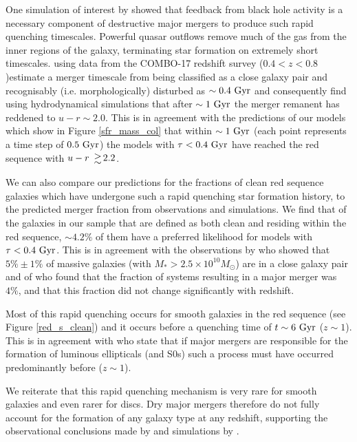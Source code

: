 \documentclass[useAMS,usenatbib]{mn2e}
\begin{document}
One simulation of interest by \citet{Springel05} showed that feedback from black hole activity is a necessary component of destructive major mergers to produce such rapid quenching timescales. Powerful quasar outflows remove much of the gas from the inner regions of the galaxy, terminating star formation on extremely short timescales. \citet{Bell06} using data from the COMBO-17 redshift survey ($0.4 < z < 0.8$)estimate a merger timescale from being classified as a close galaxy pair and recognisably (i.e. morphologically) disturbed as $\sim 0.4~\rm{Gyr}$ and \citet{Springel05} consequently find using hydrodynamical simulations that after $\sim1~\rm{Gyr}$ the merger remanent has reddened to $u-r \sim 2.0$. This is in agreement with the predictions of our models which show in Figure \ref{sfr_mass_col} that within $\sim1~\rm{Gyr}$ (each point represents a time step of $0.5~\rm{Gyr}$) the models with $\tau < 0.4~\rm{Gyr}$ have reached the red sequence with $u-r ~\ga 2.2$. 

We can also compare our predictions for the fractions of clean red sequence galaxies which have undergone such a rapid quenching star formation history, to the predicted merger fraction from observations and simulations. We find that of the galaxies in our sample that are defined as both clean and residing within the red sequence, $\sim4.2\%$ of them have a preferred likelihood for models with $\tau < 0.4~\rm{Gyr}$. This is in agreement with the observations by \citet{Bell06} who showed that $5\% \pm 1\%$ of massive galaxies (with $M_* > 2.5 \times 10^{10} M_{\odot}$) are in a close galaxy pair and of \citet{Bundy09} who found that the fraction of systems resulting in a major merger was $4\%$, and that this fraction did not change significantly with redshift. 

Most of this rapid quenching occurs for smooth galaxies in the red sequence (see Figure \ref{red_s_clean}) and it occurs before a quenching time of $t\sim6~\rm{Gyr}$ ($z\sim1$). This is in agreement with \citet{Im02} who state that if major mergers are responsible for the formation of luminous ellipticals (and S0s) such a process must have occurred predominantly before ($z\sim1$). 

We reiterate that this rapid quenching mechanism is very rare for smooth galaxies and even rarer for discs. Dry major mergers therefore do not fully account for the formation of any galaxy type at any redshift, supporting the observational conclusions made by \citet{Bell07,Bundy07, Kav14} and simulations by \citet{Genel08}.
\end{document}
